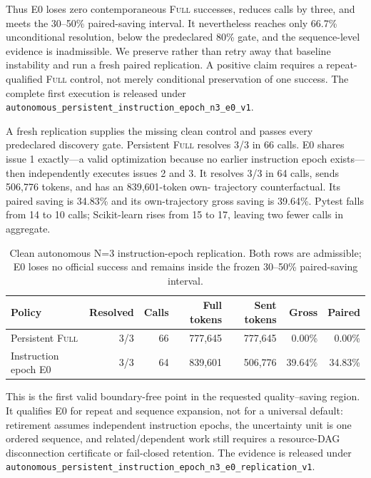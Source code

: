 \documentclass[11pt]{article}
\begin{document}
Thus E0 loses zero contemporaneous \textsc{Full} successes, reduces calls by
three, and meets the 30--50\% paired-saving interval.  It nevertheless reaches
only 66.7\% unconditional resolution, below the predeclared 80\% gate, and the
sequence-level evidence is inadmissible.  We preserve rather than retry away
that baseline instability and run a fresh paired replication.  A positive
claim requires a repeat-qualified \textsc{Full} control, not merely conditional
preservation of one success.  The complete first execution is released under
\texttt{autonomous\_persistent\_instruction\_epoch\_n3\_e0\_v1}.

A fresh replication supplies the missing clean control and passes every
predeclared discovery gate.  Persistent \textsc{Full} resolves 3/3 in 66 calls.
E0 shares issue 1 exactly---a valid optimization because no earlier
instruction epoch exists---then independently executes issues 2 and 3.  It
resolves 3/3 in 64 calls, sends 506,776 tokens, and has an 839,601-token own-
trajectory counterfactual.  Its paired saving is 34.83\% and its own-trajectory
gross saving is 39.64\%.  Pytest falls from 14 to 10 calls; Scikit-learn rises
from 15 to 17, leaving two fewer calls in aggregate.

\begin{table}[H]
\centering
\small
\caption{Clean autonomous N=3 instruction-epoch replication.  Both rows are
admissible; E0 loses no official success and remains inside the frozen 30--50\%
paired-saving interval.}
\label{tab:instruction-epoch-clean-replication}
\begin{tabular}{lrrrrrr}
\toprule
Policy & Resolved & Calls & Full tokens & Sent tokens & Gross & Paired \\
\midrule
Persistent \textsc{Full} & 3/3 & 66 & 777,645 & 777,645 & 0.00\% & 0.00\% \\
Instruction epoch E0 & 3/3 & 64 & 839,601 & 506,776 & 39.64\% & 34.83\% \\
\bottomrule
\end{tabular}
\end{table}

This is the first valid boundary-free point in the requested quality--saving
region.  It qualifies E0 for repeat and sequence expansion, not for a universal
default: retirement assumes independent instruction epochs, the uncertainty
unit is one ordered sequence, and related/dependent work still requires a
resource-DAG disconnection certificate or fail-closed retention.  The evidence
is released under
\texttt{autonomous\_persistent\_instruction\_epoch\_n3\_e0\_replication\_v1}.
\end{document}
